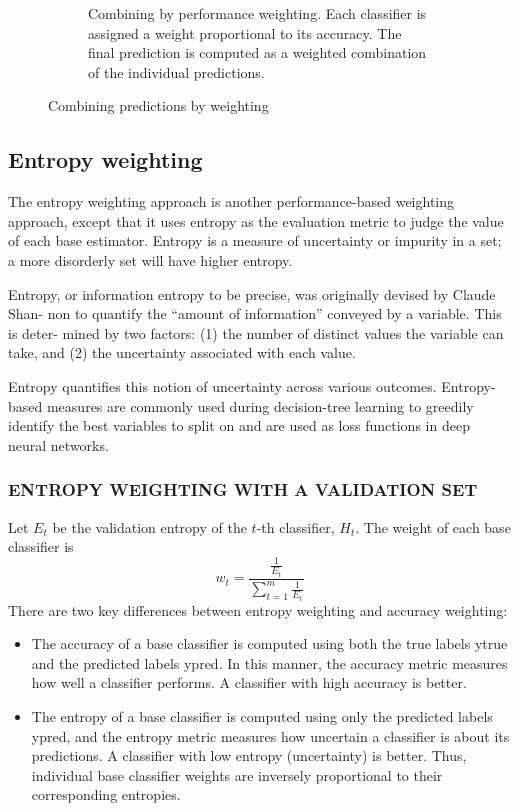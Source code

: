 \begin{figure}
\begin{subfigure}[b]{.45\textwidth}
        \caption{Combining by performance weighting. Each classifier is assigned a weight proportional to its accuracy. The final prediction is computed as a weighted combination of the individual predictions.}
    \end{subfigure}
    \caption{Combining predictions by weighting}
\end{figure}

\subsection{Entropy weighting}

The entropy weighting approach is another performance-based weighting approach,
except that it uses entropy as the evaluation metric to judge the value of each base
estimator. Entropy is a measure of uncertainty or impurity in a set; a more disorderly
set will have higher entropy.

\begin{tcolorbox}[title=Entropy]
    Entropy, or information entropy to be precise, was originally devised by Claude Shan-
    non to quantify the “amount of information” conveyed by a variable. This is deter-
    mined by two factors: (1) the number of distinct values the variable can take, and (2)
    the uncertainty associated with each value.

    Entropy quantifies this notion of uncertainty across various outcomes. Entropy-based
    measures are commonly used during decision-tree learning to greedily identify the
    best variables to split on and are used as loss functions in deep neural networks.
\end{tcolorbox}

\subsubsection*{ENTROPY WEIGHTING WITH A VALIDATION SET}
Let $E_t$ be the validation entropy of the $t$-th classifier, $H_t$. The weight of each base classifier is
\begin{equation}
    w_t=\frac{\frac{1}{E_t}}{\sum_{t=1}^{m}\frac{1}{E_t}}
\end{equation}
There are two key differences between entropy weighting and accuracy weighting:
\begin{itemize}
    \item The accuracy of a base classifier is computed using both the true labels ytrue
          and the predicted labels ypred. In this manner, the accuracy metric measures
          how well a classifier performs. A classifier with high accuracy is better.
    \item The entropy of a base classifier is computed using only the predicted labels
          ypred, and the entropy metric measures how uncertain a classifier is about its
          predictions. A classifier with low entropy (uncertainty) is better. Thus, individual base classifier weights are inversely proportional to their corresponding
          entropies.
\end{itemize}

